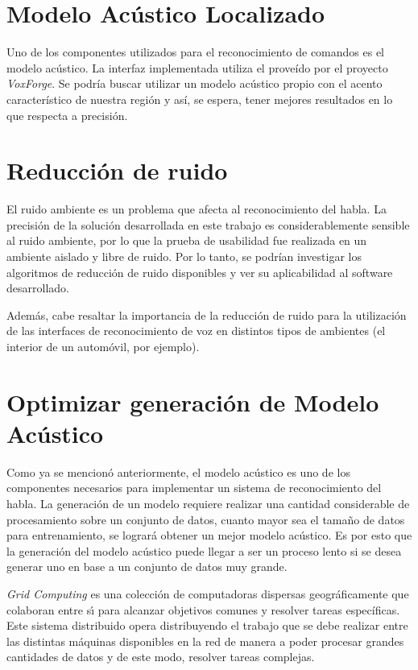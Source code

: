 \section{Modelo Ac\'ustico Localizado}  

Uno de los componentes utilizados para el reconocimiento de comandos es el modelo ac\'ustico. La interfaz 
implementada utiliza el prove\'ido por el proyecto \emph{VoxForge}. Se podr\'ia buscar utilizar un 
modelo ac\'ustico propio con el acento caracter\'istico de nuestra regi\'on y as\'i, se espera, tener 
mejores resultados en lo que respecta a precisi\'on.

\section{Reducci\'on de ruido}

El ruido ambiente es un problema que afecta al reconocimiento del habla. La precisi\'on de la
soluci\'on desarrollada en este trabajo es considerablemente sensible al ruido ambiente, por lo que 
la prueba de usabilidad fue realizada en un ambiente aislado y libre de ruido. 
Por lo tanto, se podr\'ian investigar los algoritmos de reducci\'on de ruido disponibles y ver su aplicabilidad
al software desarrollado. 

Adem\'as, cabe resaltar la importancia de la reducci\'on de ruido para la utilizaci\'on de
las interfaces de reconocimiento de voz en distintos tipos de ambientes (el interior de un autom\'ovil, por ejemplo).

\section{Optimizar generaci\'on de Modelo Ac\'ustico}

Como ya se mencion\'o anteriormente, el modelo ac\'ustico es uno de los componentes necesarios para
implementar un sistema de reconocimiento del habla. La generaci\'on de un modelo requiere realizar una 
cantidad considerable de procesamiento sobre un conjunto de datos, cuanto mayor sea el tama\~no de datos 
para entrenamiento, se lograr\'a obtener un mejor modelo ac\'ustico. 
Es por esto que la generaci\'on del modelo ac\'ustico puede llegar a ser un proceso lento si se desea 
generar uno en base a un conjunto de datos muy grande.

\emph{Grid Computing} es una colecci\'on de computadoras dispersas geogr\'aficamente que colaboran entre 
s{\'\i} para alcanzar objetivos comunes y resolver
tareas espec\'ificas. Este sistema distribuido opera distribuyendo el trabajo que se debe realizar entre 
las distintas m\'aquinas disponibles en la red
de manera a poder procesar grandes cantidades de datos y de este modo, resolver tareas complejas.

